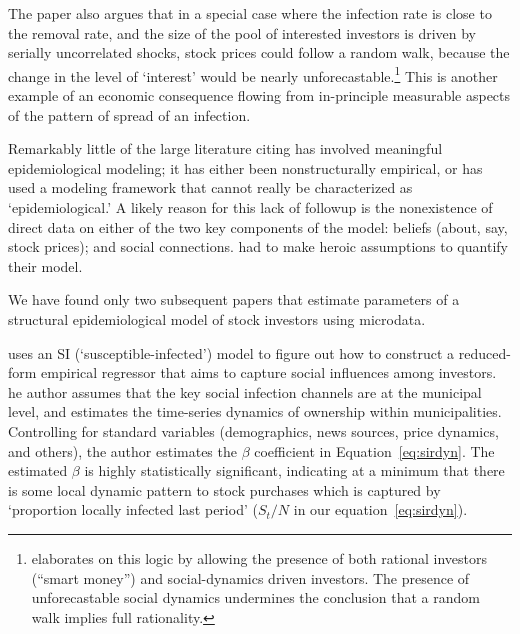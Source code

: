 The paper also argues that in a special case where the infection rate is close to the removal rate, and the size of the pool of interested investors is driven by serially uncorrelated shocks, stock prices could follow a random walk, because the change in the level of `interest' would be nearly unforecastable.\footnote{\cite{shiller1984stock} elaborates on this logic by allowing the presence of both rational investors (``smart money'') and social-dynamics driven investors. The presence of unforecastable social dynamics undermines the conclusion that a random walk implies full rationality.} This is another example of an economic consequence flowing from in-principle measurable aspects of the pattern of spread of an infection.

Remarkably little of the large literature citing \cite{shiller1989survey} has involved meaningful epidemiological modeling; it has either been nonstructurally empirical, or has used a modeling framework that cannot really be characterized as `epidemiological.'
A likely reason for this lack of followup is the nonexistence of direct data on either of the two key components of the model: beliefs (about, say, stock prices); and social connections.  \cite{shiller1989survey} had to make heroic assumptions to quantify their model.  

We have found only two subsequent papers that estimate parameters of a structural epidemiological model of stock investors using microdata.

\href{https://github.com/iworld1991/EpiExp/blob/master/Literature/shive2010epidemic.pdf}{\cite{shive2010epidemic}} uses an SI (`susceptible-infected') model to figure out how to construct a reduced-form empirical regressor that aims to capture social influences among investors.  he author assumes that the key social infection channels are at the municipal level, and estimates the time-series dynamics of ownership within municipalities.  Controlling for standard variables (demographics, news sources, price dynamics, and others), the author estimates the $\beta$ coefficient in Equation~\eqref{eq:sirdyn}.  The estimated $\beta$ is highly statistically significant, indicating at a minimum that there is some local dynamic pattern to stock purchases which is captured by `proportion locally infected last period' ($S_t/N$ in our equation~\eqref{eq:sirdyn}).

